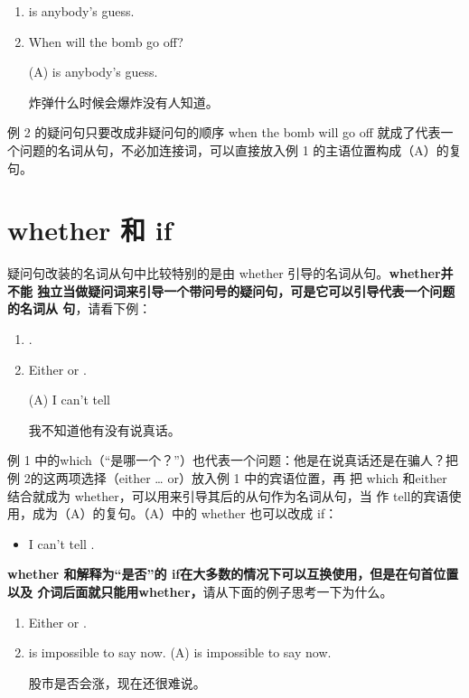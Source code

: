 \begin{enumerate}
\item {} is anybody's guess.
\item When will the bomb go off?

\reitem (A)  is anybody's guess.

炸弹什么时候会爆炸没有人知道。
\end{enumerate}

例 2 的疑问句只要改成非疑问句的顺序 when the bomb will go off
就成了代表一个问题的名词从句，不必加连接词，可以直接放入例 1
的主语位置构成（A）的复句。

\section{whether 和 if}

疑问句改装的名词从句中比较特别的是由 whether 引导的名词从句。\textbf{whether并不能
  独立当做疑问词来引导一个带问号的疑问句，可是它可以引导代表一个问题的名词从
  句}，请看下例：

\begin{enumerate}
\item {}  .
\item Either  or .

  \reitem (A) I can't tell 

  我不知道他有没有说真话。
\end{enumerate}

例 1 中的which（“是哪一个？”）也代表一个问题：他是在说真话还是在骗人？把
例 2的这两项选择（either \ldots{} or）放入例 1 中的宾语位置，再
把 which 和either 结合就成为 whether，可以用来引导其后的从句作为名词从句，当
作 tell的宾语使用，成为（A）的复句。（A）中的 whether 也可以改成 if：

\begin{itemize}
\item I can't tell .
\end{itemize}

\textbf{whether 和解释为“是否”的 if在大多数的情况下可以互换使用，但是在句首位置以及
介词后面就只能用whether，}请从下面的例子思考一下为什么。

\begin{enumerate}
\item Either  or .
\item {} is impossible to say now.
\reitem (A)  is impossible to say now.

股市是否会涨，现在还很难说。
\end{enumerate}

